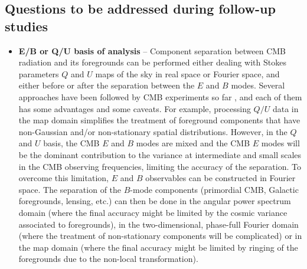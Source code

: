 \subsection{Questions to be addressed during follow-up studies}
\begin{itemize}
	\item \textbf{E/B or Q/U basis of analysis} -- Component separation between CMB radiation and its foregrounds can be performed either dealing with Stokes parameters $Q$ and $U$ maps of the sky in real space or Fourier space, and either before or after the separation between the $E$ and $B$ modes. Several approaches have been followed by CMB experiments so far \cite{gold11,planck15-11, bicepkeckplanck15},
and each of them has some advantages and some caveats. For example, processing $Q/U$ data in the map domain 
simplifies the treatment of foreground components that have non-Gaussian and/or non-stationary
spatial distributions.
However, in the $Q$ and $U$ basis, the CMB $E$ and $B$ modes are mixed and the CMB $E$ modes will be the dominant contribution to the variance at intermediate and small scales in the CMB observing frequencies, limiting the accuracy of the separation.
To overcome this limitation, $E$ and $B$ observables can be constructed in Fourier space. 
The separation of the $B$-mode components (primordial CMB, Galactic foregrounds, lensing, etc.) can then be done in the angular power spectrum domain (where the final accuracy might be limited by the cosmic variance associated to foregrounds),
in the two-dimensional, phase-full Fourier domain (where the treatment of non-stationary components
will be complicated) or in the map domain (where the final accuracy might be limited by ringing of the foregrounds due to the non-local transformation). 

\end{itemize}
